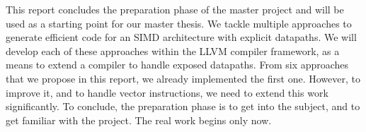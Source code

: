 This report concludes the preparation phase of the master project and will be used as a starting point for our master thesis. We tackle multiple approaches to generate efficient code for an SIMD architecture with explicit datapaths. We will develop each of these approaches within the LLVM compiler framework, as a means to extend a compiler to handle exposed datapaths. From six approaches that we propose in this report, we already implemented the first one. However, to improve it, and to handle vector instructions, we need to extend this work significantly. To conclude, the preparation phase is to get into the subject, and to get familiar with the project. The real work begins only now. 

\vspace{10mm}
 \keywords